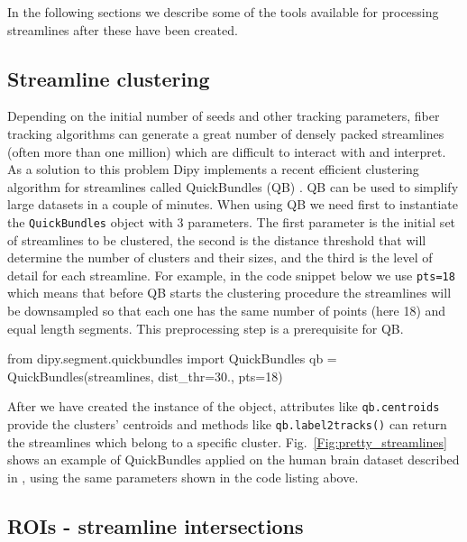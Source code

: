 \documentclass{bioinfo}
\begin{document}
In the following sections we describe some of the tools available for processing
streamlines after these have been created.
\subsection{Streamline clustering}\label{quickbundles}
Depending on the initial number of seeds and other tracking parameters,
fiber tracking algorithms can generate a great number of densely packed
streamlines (often more than one million) which are difficult to interact with
and interpret. As a solution to this problem Dipy implements a recent
efficient clustering algorithm for streamlines called QuickBundles (QB)
\citep{Garyfallidis_thesis,garyfallidis-etal:12}. QB can be used to
simplify large datasets in a couple of minutes.
When using QB we need first to instantiate the \texttt{QuickBundles} object with 3
parameters. The first parameter is the initial set of streamlines to be
clustered, the second is the distance threshold that will determine the number of clusters and their sizes,
and the third is the level of detail for each streamline. For example, in the
code snippet below we use \texttt{pts=18} which means that before QB
starts the clustering procedure the streamlines will be downsampled so that
each one has the same number of points (here 18) and equal length segments. This
preprocessing step is a prerequisite for QB.
\begin{python}
from dipy.segment.quickbundles import QuickBundles
qb = QuickBundles(streamlines, dist_thr=30.,
                  pts=18)
\end{python}
After we have created the instance of the object, attributes like
\texttt{qb.centroids} provide the clusters' centroids and methods like
\texttt{qb.label2tracks()} can return the streamlines which belong to a
specific cluster. Fig.~\ref{Fig:pretty_streamlines} shows an example of
QuickBundles applied on the human brain dataset described in \citep{Fortin2012},
using the same parameters shown in the code listing above.

\subsection{ROIs - streamline intersections}
\end{document}
